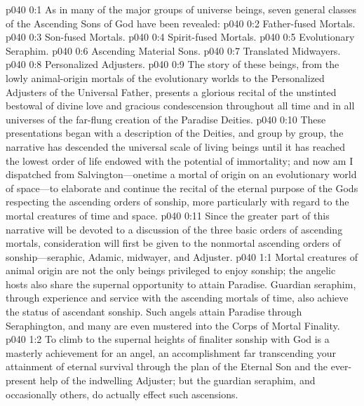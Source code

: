 \author{Mighty Messenger}
\vs p040 0:1 As in many of the major groups of universe beings, seven general classes of the Ascending Sons of God have been revealed:
\pc \vs p040 0:2 \bibnobreakspace Father\hyp{}fused Mortals.
\vs p040 0:3 \bibnobreakspace Son\hyp{}fused Mortals.
\vs p040 0:4 \bibnobreakspace Spirit\hyp{}fused Mortals.
\vs p040 0:5 \bibnobreakspace Evolutionary Seraphim.
\vs p040 0:6 \bibnobreakspace Ascending Material Sons.
\vs p040 0:7 \bibnobreakspace Translated Midwayers.
\vs p040 0:8 \bibnobreakspace Personalized Adjusters.
\pc \vs p040 0:9 The story of these beings, from the lowly animal\hyp{}origin mortals of the evolutionary worlds to the Personalized Adjusters of the Universal Father, presents a glorious recital of the unstinted bestowal of divine love and gracious condescension throughout all time and in all universes of the far\hyp{}flung creation of the Paradise Deities.
\vs p040 0:10 These presentations began with a description of the Deities, and group by group, the narrative has descended the universal scale of living beings until it has reached the lowest order of life endowed with the potential of immortality; and now am I dispatched from Salvington---onetime a mortal of origin on an evolutionary world of space---to elaborate and continue the recital of the eternal purpose of the Gods respecting the ascending orders of sonship, more particularly with regard to the mortal creatures of time and space.
\vs p040 0:11 Since the greater part of this narrative will be devoted to a discussion of the three basic orders of ascending mortals, consideration will first be given to the nonmortal ascending orders of sonship---seraphic, Adamic, midwayer, and Adjuster.
\vs p040 1:1 Mortal creatures of animal origin are not the only beings privileged to enjoy sonship; the angelic hosts also share the supernal opportunity to attain Paradise. Guardian seraphim, through experience and service with the ascending mortals of time, also achieve the status of ascendant sonship. Such angels attain Paradise through Seraphington, and many are even mustered into the Corps of Mortal Finality.
\vs p040 1:2 To climb to the supernal heights of finaliter sonship with God is a masterly achievement for an angel, an accomplishment far transcending your attainment of eternal survival through the plan of the Eternal Son and the ever\hyp{}present help of the indwelling Adjuster; but the guardian seraphim, and occasionally others, do actually effect such ascensions.
